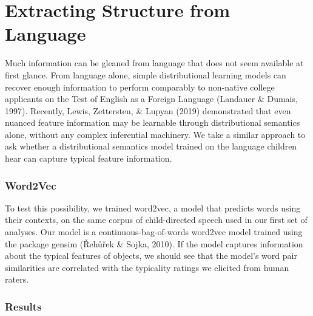 \documentclass[10pt, letterpaper]{article}
\begin{document}
\hypertarget{extracting-structure-from-language}{%
\section{Extracting Structure from
Language}\label{extracting-structure-from-language}}

Much information can be gleaned from language that does not seem
available at first glance. From language alone, simple distributional
learning models can recover enough information to perform comparably to
non-native college applicants on the Test of English as a Foreign
Language (Landauer \& Dumais, 1997). Recently, Lewis, Zettersten, \&
Lupyan (2019) demonstrated that even nuanced feature information may be
learnable through distributional semantics alone, without any complex
inferential machinery. We take a similar approach to ask whether a
distributional semantics model trained on the language children hear can
capture typical feature information.

\hypertarget{word2vec}{%
\subsubsection{Word2Vec}\label{word2vec}}

To test this possibility, we trained word2vec, a model that predicts
words using their contexts, on the same corpus of child-directed speech
used in our first set of analyses. Our model is a
continuous-bag-of-words word2vec model trained using the package gensim
(Řehůřek \& Sojka, 2010). If the model captures information about the
typical features of objects, we should see that the model's word pair
similarities are correlated with the typicality ratings we elicited from
human raters.

\hypertarget{results-1}{%
\subsubsection{Results}\label{results-1}}
\end{document}
